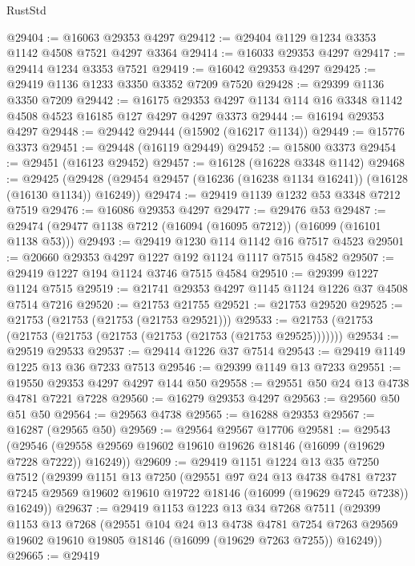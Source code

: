 \begin{lexlean}{RustStd}
\begin{coremodule}
@29404 := @16063 @29353 @4297
@29412 := @29404 @1129 @1234 @3353 @1142 @4508 @7521 @4297 @3364
@29414 := @16033 @29353 @4297
@29417 := @29414 @1234 @3353 @7521
@29419 := @16042 @29353 @4297
@29425 := @29419 @1136 @1233 @3350 @3352 @7209 @7520
@29428 := @29399 @1136 @3350 @7209
@29442 := @16175 @29353 @4297 @1134 @114 @16 @3348 @1142 @4508 @4523 @16185 @127 @4297 @4297 @3373
@29444 := @16194 @29353 @4297
@29448 := @29442 @29444 (@15902 (@16217 @1134))
@29449 := @15776 @3373
@29451 := @29448 (@16119 @29449)
@29452 := @15800 @3373
@29454 := @29451 (@16123 @29452)
@29457 := @16128 (@16228 @3348 @1142)
@29468 := @29425
    (@29428 (@29454 @29457 (@16236 (@16238 @1134 @16241)) (@16128 (@16130 @1134)) @16249))
@29474 := @29419 @1139 @1232 @53 @3348 @7212 @7519
@29476 := @16086 @29353 @4297
@29477 := @29476 @53
@29487 := @29474 (@29477 @1138 @7212 (@16094 (@16095 @7212)) (@16099 (@16101 @1138 @53)))
@29493 := @29419 @1230 @114 @1142 @16 @7517 @4523
@29501 := @20660 @29353 @4297 @1227 @192 @1124 @1117 @7515 @4582
@29507 := @29419 @1227 @194 @1124 @3746 @7515 @4584
@29510 := @29399 @1227 @1124 @7515
@29519 := @21741 @29353 @4297 @1145 @1124 @1226 @37 @4508 @7514 @7216
@29520 := @21753 @21755
@29521 := @21753 @29520
@29525 := @21753 (@21753 (@21753 (@21753 @29521)))
@29533 := @21753 (@21753 (@21753 (@21753 (@21753 (@21753 (@21753 (@21753 @29525)))))))
@29534 := @29519 @29533
@29537 := @29414 @1226 @37 @7514
@29543 := @29419 @1149 @1225 @13 @36 @7233 @7513
@29546 := @29399 @1149 @13 @7233
@29551 := @19550 @29353 @4297 @4297 @144 @50
@29558 := @29551 @50 @24 @13 @4738 @4781 @7221 @7228
@29560 := @16279 @29353 @4297
@29563 := @29560 @50 @51 @50
@29564 := @29563 @4738
@29565 := @16288 @29353
@29567 := @16287 (@29565 @50)
@29569 := @29564 @29567 @17706
@29581 := @29543
    (@29546 (@29558 @29569 @19602 @19610 @19626 @18146 (@16099 (@19629 @7228 @7222)) @16249))
@29609 := @29419
    @1151
    @1224
    @13
    @35
    @7250
    @7512
    (@29399
      @1151
      @13
      @7250
      (@29551
        @97
        @24
        @13
        @4738
        @4781
        @7237
        @7245
        @29569
        @19602
        @19610
        @19722
        @18146
        (@16099 (@19629 @7245 @7238))
        @16249))
@29637 := @29419
    @1153
    @1223
    @13
    @34
    @7268
    @7511
    (@29399
      @1153
      @13
      @7268
      (@29551
        @104
        @24
        @13
        @4738
        @4781
        @7254
        @7263
        @29569
        @19602
        @19610
        @19805
        @18146
        (@16099 (@19629 @7263 @7255))
        @16249))
@29665 := @29419

\end{coremodule}
\end{lexlean}
